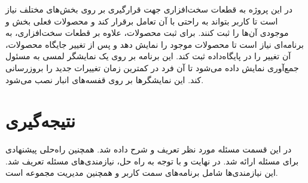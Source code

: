 در این پروژه به قطعات سخت‌افزاری جهت قرارگیری بر روی بخش‌های مختلف نیاز است تا کاربر بتواند به راحتی با آن تعامل برقرار کند و محصولات فعلی بخش  و موجودی آن‌ها را ثبت کنند. برای ثبت محصولات، علاوه بر قطعات سخت‌افزاری، به برنامه‌ای نیاز است تا محصولات موجود را نمایش دهد و پس از تغییر جایگاه محصولات، آن تغییر را در پایگاه‌داده ثبت کند. این برنامه بر روی یک نمایشگر لمسی به مسئول جمع‌آوری نمایش داده می‌شود تا آن فرد در کمترین زمان تغییرات جدید را بروزرسانی کند. این نمایشگرها بر روی قفسه‌های انبار نصب می‌شود.


\section{نتیجه‌گیری}
در این قسمت مسئله مورد نظر تعریف و شرح داده شد. همچنین راه‌حلی پیشنهادی برای مسئله ارائه شد. در نهایت و با توجه به راه حل، نیازمندی‌های مسئله تعریف شد. این نیازمندی‌ها شامل برنامه‌های سمت کاربر و همچنین مدیریت مجموعه است.
